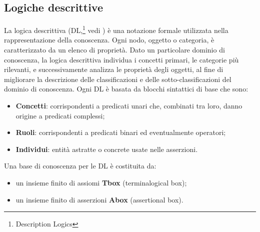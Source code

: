 \documentclass[a4paper,11pt]{article}
\begin{document}
\newpage

\subsection{Logiche descrittive}
\label{sec:2.3}

La logica descrittiva (DL,\footnote{Description Logics} vedi \cite{DLHANDBOOK2})
è una notazione formale utilizzata nella rappresentazione della conoscenza. Ogni nodo, oggetto o categoria, è caratterizzato da un elenco di proprietà.
Dato un particolare dominio di conoscenza, la logica descrittiva individua i concetti primari, le categorie più rilevanti, e successivamente analizza le proprietà degli oggetti, al fine di migliorare la descrizione delle classificazioni e delle sotto-classificazioni del dominio di conoscenza. Ogni DL è basata da blocchi sintattici di base che sono:
\begin{itemize}
\item \textbf{Concetti}: corrispondenti a predicati unari che, combinati tra loro, danno origine a predicati complessi; 
\item \textbf{Ruoli}: corrispondenti a predicati binari ed eventualmente operatori;
\item \textbf{Individui}: entità astratte o concrete usate nelle asserzioni.
\end{itemize}
Una base di conoscenza per le DL è costituita da:
\begin{itemize}
\item un insieme finito di assiomi \textbf{Tbox} (terminalogical box);
\item un insieme finito di asserzioni \textbf{Abox} (assertional box).
\end{itemize}
\end{document}
